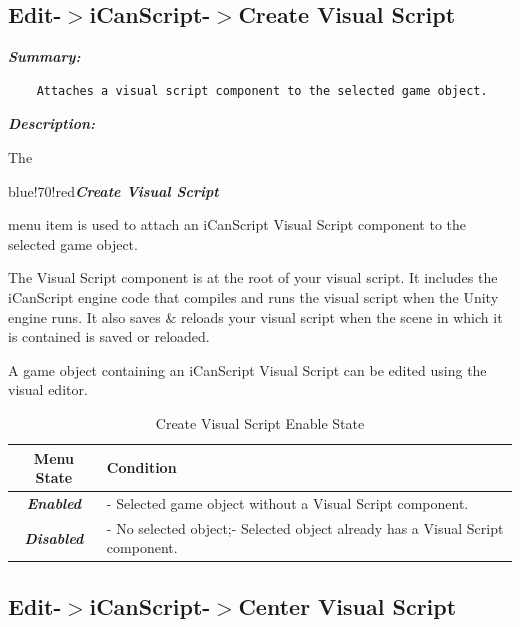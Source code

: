 \subsection{Edit-$>$iCanScript-$>$Create Visual Script}
\label{edit-icanscript-createvisualscript}

\emph{\textbf{Summary:}}

\begin{verbatim}
    Attaches a visual script component to the selected game object.
\end{verbatim}

\emph{\textbf{Description:}}

The \begin{color}{blue!70!red}\emph{\textbf{Create Visual Script}}\end{color} menu item is used to attach an iCanScript Visual Script component to the selected game object.

The Visual Script component is at the root of your visual script. It includes the iCanScript engine code that compiles and runs the visual script when the Unity engine runs. It also saves \& reloads your visual script when the scene in which it is contained is saved or reloaded.

A game object containing an iCanScript Visual Script can be edited using the visual editor.

\begin{table}[htbp]
\begin{minipage}{\linewidth}
\setlength{\tymax}{0.5\linewidth}
\centering
\small
\caption{Create Visual Script Enable State}
\label{createvisualscriptenablestate}
\begin{tabulary}{\textwidth}{@{}CL@{}} \toprule
Menu State&Condition\\
\midrule
\emph{\textbf{Enabled}}&- Selected game object without a Visual Script component.\\
\emph{\textbf{Disabled}}&- No selected object;- Selected object already has a Visual Script component.\\

\bottomrule

\end{tabulary}
\end{minipage}
\end{table}

\subsection{Edit-$>$iCanScript-$>$Center Visual Script}
\label{edit-icanscript-centervisualscript}

